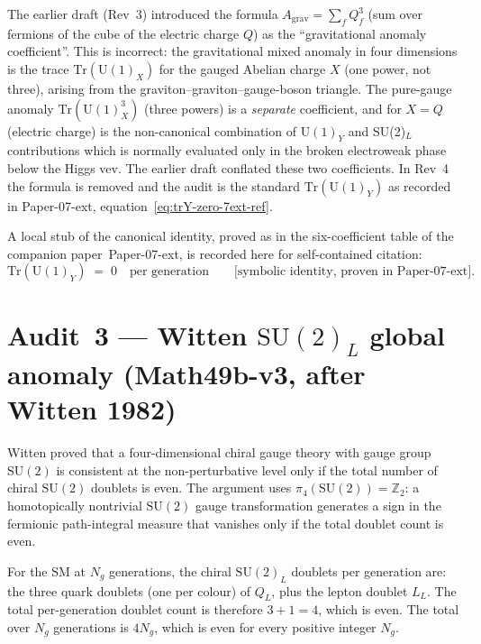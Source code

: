 \begin{remark}[Removal of the non-standard $A_{\mathrm{grav}} = \sum_f
Q_f^3$ formula]\label{rmk:remove-Q3}
The earlier draft (Rev~3) introduced the formula
$A_{\mathrm{grav}} = \sum_f Q_f^3$ (sum over fermions of the cube of
the electric charge $Q$) as the ``gravitational anomaly coefficient''.
This is incorrect: the gravitational mixed anomaly in four dimensions
is the trace $\mathrm{Tr}(\mathrm{U}(1)_X)$ for the gauged Abelian
charge $X$ (one power, not three), arising from the
graviton--graviton--gauge-boson triangle. The pure-gauge anomaly
$\mathrm{Tr}(\mathrm{U}(1)_X^3)$ (three powers) is a
\emph{separate} coefficient, and for $X = Q$ (electric charge) is the
non-canonical combination of $\mathrm{U}(1)_Y$ and SU(2)$_L$
contributions which is normally evaluated only in the broken
electroweak phase below the Higgs vev. The earlier draft conflated
these two coefficients. In Rev~4 the formula is removed and the audit
is the standard $\mathrm{Tr}(\mathrm{U}(1)_Y)$ as recorded in
Paper-07-ext, equation~\eqref{eq:trY-zero-7ext-ref}.
\end{remark}

A local stub of the canonical identity, proved as
in the six-coefficient table of the companion paper~Paper-07-ext, is
recorded here for self-contained citation:
\begin{equation}\label{eq:trY-zero-7ext-ref}
  \mathrm{Tr}(\mathrm{U}(1)_Y) \;=\; 0 \quad\text{per generation}
  \qquad\text{[symbolic identity, proven in Paper-07-ext]}.
\end{equation}

\section{Audit~3 --- Witten $\mathrm{SU}(2)_L$ global anomaly
(Math49b-v3, after Witten 1982)}\label{sec:witten}
Witten \cite{Witten1982} proved that a four-dimensional chiral gauge
theory with gauge group $\mathrm{SU}(2)$ is consistent at the
non-perturbative level only if the total number of chiral
$\mathrm{SU}(2)$ doublets is even. The argument uses
$\pi_4(\mathrm{SU}(2)) = \mathbb{Z}_2$: a homotopically nontrivial
$\mathrm{SU}(2)$ gauge transformation generates a sign in the
fermionic path-integral measure that vanishes only if the total
doublet count is even.

For the SM at $N_g$ generations, the chiral $\mathrm{SU}(2)_L$
doublets per generation are: the three quark doublets (one per
colour) of $Q_L$, plus the lepton doublet $L_L$. The total per-generation
doublet count is therefore $3+1 = 4$, which is even. The total over
$N_g$ generations is $4 N_g$, which is even for every positive
integer $N_g$.

